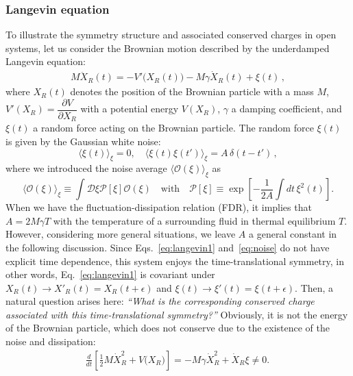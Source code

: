 \documentclass[a4paper,11pt]{article}
\begin{document}
\subsubsection{Langevin equation}
\label{section:Langevin}
To illustrate the symmetry structure and associated conserved charges 
in open systems, let us consider the Brownian motion described 
by the underdamped Langevin equation:
\begin{align}
 M \ddot X_R (t) =- V'\big(X_R(t)\big) - M \gamma \dot X_R(t) +\xi (t) \,,
 \label{eq:langevin1}
\end{align}
where $X_R(t)$ denotes the position of the Brownian particle with a mass $M$,
$V'(X_R) = \dfrac{\partial V}{\partial X_R}$ with a
 potential energy $V(X_R)$, 
$\gamma$ a damping coefficient, 
and $\xi (t)$ a random force acting on the Brownian particle. 
The random force $\xi(t)$ 
is given by the Gaussian white noise:
\begin{equation} 
 \langle \xi(t) \rangle_\xi  = 0 , \quad 
  \langle \xi(t)\xi(t')\rangle_\xi 
  = A \,\delta(t-t')\,,
  \label{eq:noise}
\end{equation}
where we introduced the noise average $\langle \mathcal{O}(\xi) \rangle_\xi$ as 
\begin{equation}
 \langle \mathcal{O}(\xi) \rangle_\xi 
  \equiv \int \mathcal{D} \xi
  \mathcal P[\xi] \mathcal{O} (\xi) 
  \quad \mathrm{with} \quad 
  \mathcal P[\xi] \equiv \exp \left[ - \frac{1}{2A} \int dt\, \xi^2(t) \right].
  \label{eq:NoiseAvg}
\end{equation}
When we have the fluctuation-dissipation 
relation (FDR), it implies that 
$A= 2 M \gamma T$ 
with the temperature of a surrounding fluid in thermal equilibrium $T$.
However, considering more general situations, 
we leave $A$ a general constant in the following discussion. 
Since Eqs.~\eqref{eq:langevin1} and~\eqref{eq:noise} do not 
have explicit time dependence, 
this system enjoys the time-translational symmetry, in other words, Eq.~\eqref{eq:langevin1} is covariant under $X_R(t)\to X'_R(t)=X_R(t+\epsilon)$ and $\xi(t)\to \xi'(t)=\xi(t+\epsilon)$.
Then, a natural question arises here: 
\textit{``What is the corresponding conserved charge associated with 
this time-translational symmetry?''}
Obviously, it is not the energy of the Brownian particle, 
which does not conserve due to the existence of the noise and dissipation:
\begin{align}
 \frac{d}{dt}\left[\frac{1}{2} M \dot X^2_R + V \big(X_R \big) \right] 
 = - M \gamma \dot X^2_R + \dot X_R \xi \neq 0 . \,\label{consviolgv}
\end{align}
\end{document}
